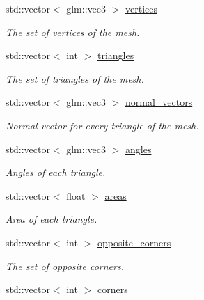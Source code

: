 \begin{DoxyCompactItemize}
\item 
\mbox{\label{classgeoproc_1_1TriangleMesh_a82c3351de37daa9440f53597f080992d}} 
std\+::vector$<$ glm\+::vec3 $>$ \hyperlink{classgeoproc_1_1TriangleMesh_a82c3351de37daa9440f53597f080992d}{vertices}
\begin{DoxyCompactList}\small\item\em The set of vertices of the mesh. \end{DoxyCompactList}\item 
std\+::vector$<$ int $>$ \hyperlink{classgeoproc_1_1TriangleMesh_ad1cf20622f2bb080100862f413bd89c2}{triangles}
\begin{DoxyCompactList}\small\item\em The set of triangles of the mesh. \end{DoxyCompactList}\item 
std\+::vector$<$ glm\+::vec3 $>$ \hyperlink{classgeoproc_1_1TriangleMesh_ab9030a0301b2fe5868ad6c08692cce09}{normal\+\_\+vectors}
\begin{DoxyCompactList}\small\item\em Normal vector for every triangle of the mesh. \end{DoxyCompactList}\item 
std\+::vector$<$ glm\+::vec3 $>$ \hyperlink{classgeoproc_1_1TriangleMesh_ab255af87d20d76ad84246560fa3579b3}{angles}
\begin{DoxyCompactList}\small\item\em Angles of each triangle. \end{DoxyCompactList}\item 
std\+::vector$<$ float $>$ \hyperlink{classgeoproc_1_1TriangleMesh_a684ecaaa03f1739856bba03167e51dd1}{areas}
\begin{DoxyCompactList}\small\item\em Area of each triangle. \end{DoxyCompactList}\item 
std\+::vector$<$ int $>$ \hyperlink{classgeoproc_1_1TriangleMesh_a2604795c90c694116513252b86d242b4}{opposite\+\_\+corners}
\begin{DoxyCompactList}\small\item\em The set of opposite corners. \end{DoxyCompactList}\item 
std\+::vector$<$ int $>$ \hyperlink{classgeoproc_1_1TriangleMesh_ab9610d614e081deb28010d237fecd55b}{corners}

\end{DoxyCompactItemize}
